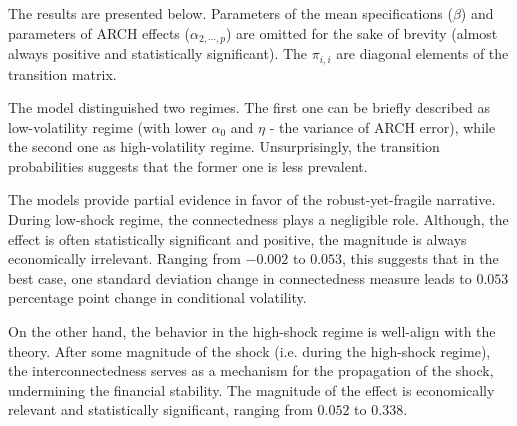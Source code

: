 \documentclass{article}
\begin{document}
The results are presented below. Parameters of the mean specifications ($\beta$) and parameters of ARCH effects ($\alpha_{2,\cdots,p}$) are omitted for the sake of brevity (almost always positive and statistically significant). The $\pi_{i,i}$ are diagonal elements of the transition matrix.

The model distinguished two regimes. The first one can be briefly described as low-volatility regime (with lower $\alpha_0$ and $\eta$ - the variance of ARCH error), while the second one as high-volatility regime. Unsurprisingly, the transition probabilities suggests that the former one is less prevalent. 

The models provide partial evidence in favor of the robust-yet-fragile narrative. During low-shock regime, the connectedness plays a negligible role. Although, the effect is often statistically significant and positive, the magnitude is always economically irrelevant. Ranging from $-0.002$ to $0.053$, this suggests that in the best case, one standard deviation change in connectedness measure leads to $0.053$ percentage point change in conditional volatility. 

On the other hand, the behavior in the high-shock regime is well-align with the theory. After some magnitude of the shock (i.e. during the high-shock regime), the interconnectedness serves as a mechanism for the propagation of the shock, undermining the financial stability. The magnitude of the effect is economically relevant and statistically significant, ranging from $0.052$ to $0.338$. 

\
\end{document}
